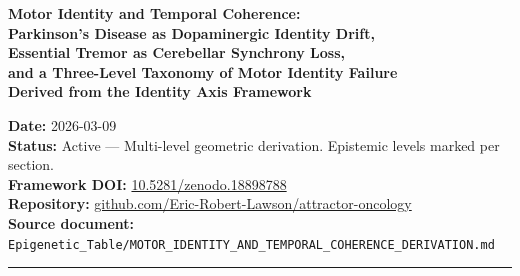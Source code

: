 \documentclass[12pt,a4paper]{article}
\newcommand{\Lev}[1]{\textbf{Level~#1}}
\begin{document}
\begin{titlepage}
\vspace*{1.5cm}
{\LARGE\bfseries Motor Identity and Temporal Coherence:\\[0.5em]
\large Parkinson's Disease as Dopaminergic Identity Drift,\\
Essential Tremor as Cerebellar Synchrony Loss,\\
and a Three-Level Taxonomy of Motor Identity Failure\\
Derived from the Identity Axis Framework}

\vspace{1.5em}

\author[1]{Eric Robert Lawson}

\vspace{1.5em}

\noindent\textbf{Date:} 2026-03-09\\
\textbf{Status:} Active --- Multi-level geometric derivation.
Epistemic levels marked per section.\\
\textbf{Framework DOI:}
\href{https://doi.org/10.5281/zenodo.18898788}{10.5281/zenodo.18898788}\\
\textbf{Repository:}
\href{https://github.com/Eric-Robert-Lawson/attractor-oncology}{github.com/Eric-Robert-Lawson/attractor-oncology}\\
\textbf{Source document:}
\texttt{Epigenetic\_Table/MOTOR\_IDENTITY\_AND\_TEMPORAL\_COHERENCE\_DERIVATION.md}

\vspace{1.5em}
\noindent\rule{\textwidth}{0.8pt}

\begin{abstract}
\noindent
The Identity Axis Framework defines disease as loss of identity
maintenance expressed as $R = A/H$, where $A$ is the Identity Anchor
and $H$ is the Convergence Hub. Prior derivations in this series have
addressed cellular identity failure (\Lev{1}) exclusively. This paper
introduces the Motor Identity Class --- a table entry category with
three distinct identity levels absent from all other framework entries ---
and derives the complete taxonomy: \Lev{1} (cellular), \Lev{2}
(connectivity), and \Lev{3} (temporal).


\end{abstract}
\end{titlepage}
\end{document}
